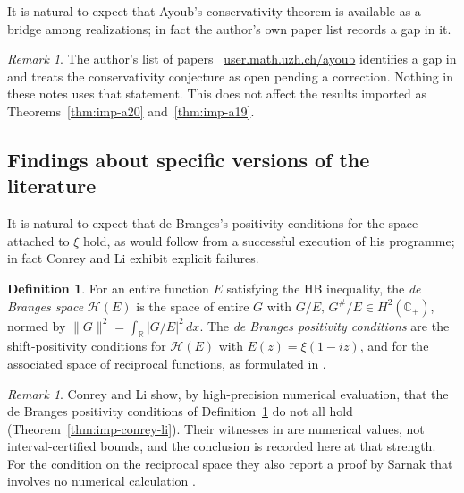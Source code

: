 \documentclass[11pt]{amsart}
\theoremstyle{plain}
\theoremstyle{definition}
\newtheorem{definition}[theorem]{Definition}
\theoremstyle{remark}
\newtheorem{remark}[theorem]{Remark}
\numberwithin{equation}{section}
\newcommand{\ayoubpage}{\cite{AyoubHomepage}\,%
  \href{https://user.math.uzh.ch/ayoub/}{\textsf{user.math.uzh.ch/ayoub}}}
\newcommand{\R}{\mathbb{R}}
\newcommand{\Cp}{\mathbb{C}_{+}}
\begin{document}
It is natural to expect that Ayoub's conservativity theorem is available
as a bridge among realizations; in fact the author's own paper list
records a gap in it.

\begin{remark}\label{rem:R8}
The author's list of papers \ayoubpage{} identifies a gap in
\cite[Theorem~8.3.10]{Ayoub2018FoliatedConservativity} and treats the
conservativity conjecture as open pending a correction. Nothing in these
notes uses that statement. This does not affect the results imported as
Theorems~\ref{thm:imp-a20} and~\ref{thm:imp-a19}.
\end{remark}

\subsection{Findings about specific versions of the literature}
\label{subsec:neg-literature}

It is natural to expect that de Branges's positivity conditions for the
space attached to $\xi$ hold, as would follow from a successful
execution of his programme; in fact Conrey and Li exhibit explicit
failures.

\begin{definition}\label{def:conrey-li}
For an entire function $E$ satisfying the HB inequality, the
\emph{de Branges space} $\mathcal H(E)$ is the space of entire $G$ with
$G/E,\,G^\#/E\in H^2(\Cp)$, normed by $\|G\|^2=\int_\R|G/E|^2\,dx$. The
\emph{de Branges positivity conditions} are the shift-positivity
conditions for $\mathcal H(E)$ with $E(z)=\xi(1-iz)$, and for the
associated space of reciprocal functions, as formulated in
\cite[\S3.1, (3.1)--(3.4), pp.~6--7]{ConreyLi2000Positivity}.
\end{definition}

\begin{remark}\label{rem:R13}
Conrey and Li show, by high-precision numerical evaluation, that the de
Branges positivity conditions of Definition~\ref{def:conrey-li} do not
all hold (Theorem~\ref{thm:imp-conrey-li}). Their witnesses in
\cite[\S3.1]{ConreyLi2000Positivity} are numerical values, not
interval-certified bounds, and the conclusion is recorded here at that
strength. For the condition on the reciprocal space they also report a
proof by Sarnak that involves no numerical calculation
\cite[Remark, p.~9]{ConreyLi2000Positivity}.
\end{remark}
\end{document}
